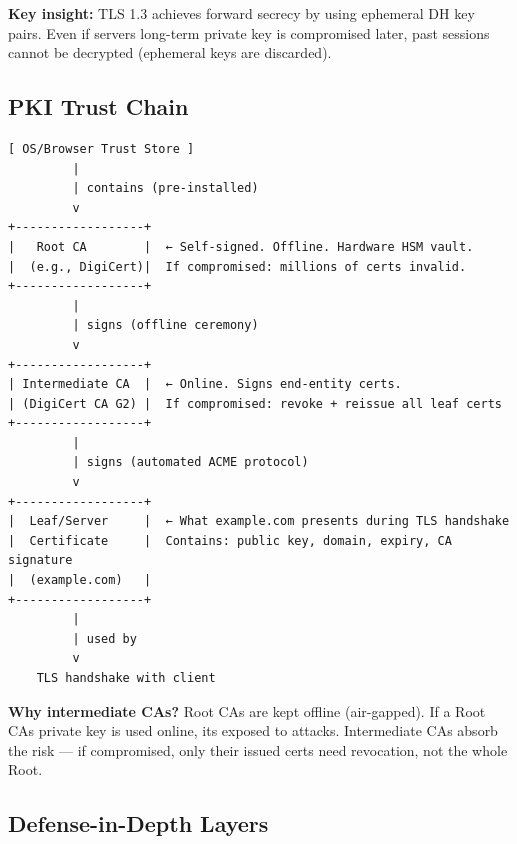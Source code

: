 \documentclass[11pt]{article}
\begin{document}
\textbf{Key insight:} TLS 1.3 achieves forward secrecy by using ephemeral DH key pairs. Even if server\textquotesingle s long-term private key is compromised later, past sessions cannot be decrypted (ephemeral keys are discarded).

\subsection{PKI Trust Chain}\label{pki-trust-chain}

\setcodelang{}

\begin{verbatim}
[ OS/Browser Trust Store ]
         |
         | contains (pre-installed)
         v
+------------------+
|   Root CA        |  ← Self-signed. Offline. Hardware HSM vault.
|  (e.g., DigiCert)|  If compromised: millions of certs invalid.
+------------------+
         |
         | signs (offline ceremony)
         v
+------------------+
| Intermediate CA  |  ← Online. Signs end-entity certs.
| (DigiCert CA G2) |  If compromised: revoke + reissue all leaf certs
+------------------+
         |
         | signs (automated ACME protocol)
         v
+------------------+
|  Leaf/Server     |  ← What example.com presents during TLS handshake
|  Certificate     |  Contains: public key, domain, expiry, CA signature
|  (example.com)   |
+------------------+
         |
         | used by
         v
    TLS handshake with client
\end{verbatim}

\textbf{Why intermediate CAs?} Root CAs are kept offline (air-gapped). If a Root CA\textquotesingle s private key is used online, it\textquotesingle s exposed to attacks. Intermediate CAs absorb the risk --- if compromised, only their issued certs need revocation, not the whole Root.

\subsection{Defense-in-Depth Layers}\label{defense-in-depth-layers}

\setcodelang{}
\end{document}
